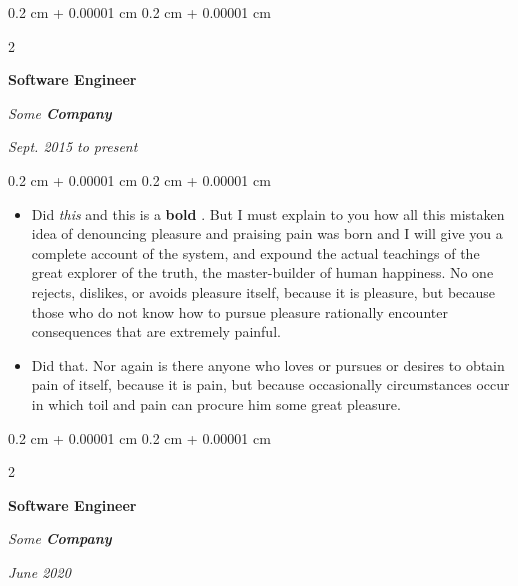 \documentclass[10pt, letterpaper]{article}
\newenvironment{highlights}{
    \begin{itemize}[
        topsep=0.10 cm,
        parsep=0.10 cm,
        partopsep=0pt,
        itemsep=0pt,
        leftmargin=0.4 cm + 10pt
    ]
}{
    \end{itemize}
} %
\newenvironment{onecolentry}{
    \begin{adjustwidth}{
        0.2 cm + 0.00001 cm
    }{
        0.2 cm + 0.00001 cm
    }
}{
    \end{adjustwidth}
} %
\newenvironment{twocolentry}[2][]{
    \onecolentry
    \def\secondColumn{#2}
    \setcolumnwidth{\fill, 4.5 cm}
    \begin{paracol}{2}
}{
    \switchcolumn \raggedleft \secondColumn
    \end{paracol}
    \endonecolentry
} %
\let\hrefWithoutArrow\href
\renewcommand{\href}[2]{\hrefWithoutArrow{#1}{\mbox{\ifthenelse{\equal{#2}{}}{ }{#2 }\raisebox{.15ex}{\footnotesize \faExternalLink*}}}}
\begin{document}
        \vspace{0.2 cm-3px}

        \begin{twocolentry}{
            
            
        \textit{Sept. 2015 to present}}
            \textbf{Software Engineer}
            
            \textit{Some \textbf{Company}}
        \end{twocolentry}

        \vspace{0.10 cm-3px}
        \begin{onecolentry}
            \begin{highlights}
                \item Did \textit{this} and this is a \textbf{bold} \href{https://example.com}{link}. But I must explain to you how all this mistaken idea of denouncing pleasure and praising pain was born and I will give you a complete account of the system, and expound the actual teachings of the great explorer of the truth, the master-builder of human happiness. No one rejects, dislikes, or avoids pleasure itself, because it is pleasure, but because those who do not know how to pursue pleasure rationally encounter consequences that are extremely painful.
                \item Did that. Nor again is there anyone who loves or pursues or desires to obtain pain of itself, because it is pain, but because occasionally circumstances occur in which toil and pain can procure him some great pleasure.
            \end{highlights}
        \end{onecolentry}


        \vspace{0.2 cm-3px}

        \begin{twocolentry}{
            
            
        \textit{June 2020}}
            \textbf{Software Engineer}
            
            \textit{Some \textbf{Company}}
        \end{twocolentry}
\end{document}
